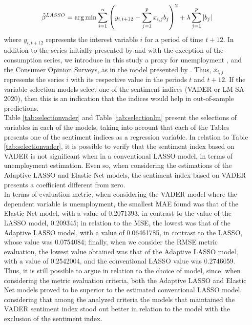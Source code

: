 \begin{align}
    \hat{\beta}^{LASSO} = \operatorname*{arg\,min} \sum_{i=1}^{n}\left(y_{i,t+12} - \sum_{j=1}^{p}x_{i,j}b_j\right)^2 +\lambda\sum_{j=1}^p |b_j|
\end{align}
where $y_{i,t+12}$ represents the interest variable $i$ for a period of time $t+12$. In addition to the series initially presented by \cite{barsky2012information} and with the exception of the consumption series, we introduce in this study a proxy for unemployment \cite[]{shapiro2020measuring}, and the Consumer Opinion Surveys, as in the model presented by \cite{shapiro2020measuring}. Thus, $x_{i,j}$ represents the series $i$ with its respective value in the periods $t$ and $t+12$. If the variable selection models select one of the sentiment indices (VADER or LM-SA-2020), then this is an indication that the indices would help in out-of-sample predictions.\\

Table \ref{tab:selectionvader} and Table \ref{tab:selectionlm} present the selections of variables in each of the models, taking into account that each of the Tables presents one of the sentiment indices as a regression variable. In relation to Table \ref{tab:selectionvader}, it is possible to verify that the sentiment index based on VADER is not significant when in a conventional LASSO model, in terms of unemployment estimation. Even so, when considering the estimations of the Adaptive LASSO and Elastic Net models, the sentiment index based on VADER presents a coefficient different from zero.\\

In terms of evaluation metric, when considering the VADER model where the dependent variable is unemployment, the smallest MAE found was that of the Elastic Net model, with a value of 0.2071393, in contrast to the value of the LASSO model, 0.209345; in relation to the MSE, the lowest was that of the Adaptive LASSO model, with a value of 0.06461785, in contrast to the LASSO, whose value was 0.0754084; finally, when we consider the RMSE metric evaluation, the lowest value obtained was that of the Adaptive LASSO model, with a value of 0.2542004, and the conventional LASSO value was 0.2746059. Thus, it is still possible to argue in relation to the choice of model, since, when considering the metric evaluation criteria, both the Adaptive LASSO and Elastic Net models proved to be superior to the estimated conventional LASSO model, considering that among the analyzed criteria the models that maintained the VADER sentiment index stood out better in relation to the model with the exclusion of the sentiment index.\\

